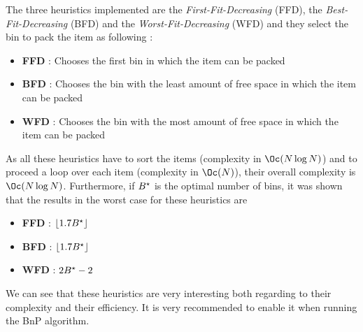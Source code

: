 The three heuristics implemented are the \textit{First-Fit-Decreasing} (FFD), the \textit{Best-Fit-Decreasing} (BFD) and the \textit{Worst-Fit-Decreasing} (WFD) and they select the bin to pack the item as following :
\begin{itemize}
	\item \textbf{FFD} :  Chooses the first bin in which the item can be packed
	\item \textbf{BFD} :  Chooses the bin with the least amount of free space in which the item can be packed
	\item \textbf{WFD} : Chooses the bin with the most amount of free space in which the item can be packed
\end{itemize}
As all these heuristics have to sort the items (complexity in $\Oc( N\log N)$) and to proceed a loop over each item (complexity in $\Oc (N)$), their overall complexity is $\Oc (N\log N)$. Furthermore, if ${B}^{\star}$ is the optimal number of bins, it was shown that the results in the worst case for these heuristics are
\begin{itemize}
	\item \textbf{FFD} :  $\lfloor1.7 {B}^{\star}\rfloor$ \cite{dosa2013first}
	\item \textbf{BFD} : $\lfloor1.7 {B}^{\star}\rfloor$ \cite{dosa2014optimal}
	\item \textbf{WFD} : $2{B}^{\star} - 2$ \cite{johnson1973near}
\end{itemize}
We can see that these heuristics are very interesting both regarding to their complexity and their efficiency. It is very recommended to enable it when running the BnP algorithm.